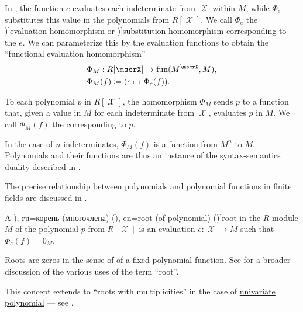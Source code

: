 \begin{concept}\label{con:evaluation_homomorphism}\mimprovised
  In , the function \( e \) evaluates each indeterminate from \( \mscrX \) within \( M \), while \( \Phi_e \) substitutes this value in the polynomials from \( R[\mscrX] \). We call \( \Phi_e \) the \term[en=evaluation homomorphism (\cite[98]{Lang2002Algebra})]{evaluation homomorphism} or \term[en=substitution homomorphism (\cite[151]{Knapp2016BasicAlgebra})]{substitution homomorphism} corresponding to the  \( e \). We can parameterize this by the evaluation functions to obtain the \enquote{functional evaluation homomorphism}
  \begin{equation*}
    \begin{aligned}
      &\Phi_M: R[\mscrX] \to \fun(M^\mscrX, M), \\
      &\Phi_M(f) \coloneqq (e \mapsto \Phi_e(f)).
    \end{aligned}
  \end{equation*}

  To each polynomial \( p \) in \( R[\mscrX] \), the homomorphism \( \Phi_M \) sends \( p \) to a function that, given a value in \( M \) for each indeterminate from \( \mscrX \), evaluates \( p \) in \( M \). We call \( \Phi_M(f) \) the  corresponding to \( p \).

  In the case of \( n \) indeterminates, \( \Phi_M(f) \) is a function from \( M^n \) to \( M \). Polynomials and their functions are thus an instance of the syntax-semantics duality described in .

  The precise relationship between polynomials and polynomial functions in \hyperref[thm:finite_fields]{finite fields} are discussed in .
\end{concept}

\begin{definition}\label{def:root_of_polynomial}\mimprovised
  A \term[bg=корен (на уравнение) (\cite[2]{Обрешков1962ВисшаАлгебра}), ru=корень (многочлена) (\cite[99]{Винберг2014КурсАлгебры}), en=root (of polynomial) (\cite[281]{Aluffi2009Algebra})]{root} in the \( R \)-module \( M \) of the polynomial \( p \) from \( R[\mscrX] \) is an evaluation \( e: \mscrX \to M \) such that \( \Phi_e(f) = 0_M \).
\end{definition}
\begin{comments}
  \item Roots are zeros in the sense of  of a fixed polynomial function. See  for a broader discussion of the various uses of the term \enquote{root}.

  \item This concept extends to \enquote{roots with multiplicities} in the case of \hyperref[def:univariate_polynomial]{univariate polynomial} --- see .
\end{comments}

